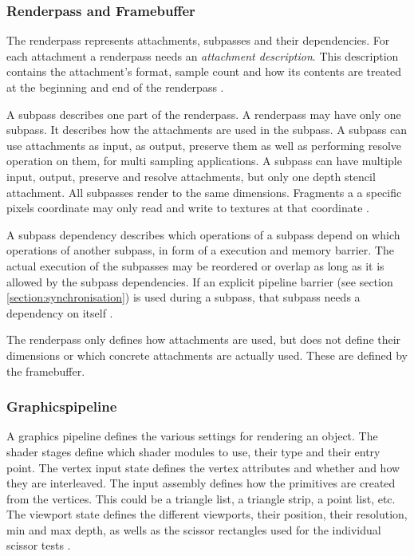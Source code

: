 \subsubsection{Renderpass and Framebuffer}
\label{section:renderpass}

The renderpass represents attachments, subpasses and their dependencies. For each attachment a renderpass needs an \textit{attachment description}. This description contains the attachment's format, sample count and how its contents are treated at the beginning and end of the renderpass \cite{khronos:vulkan:spec1.1}.

A subpass describes  one part of the renderpass. A renderpass may have only one subpass. It describes how the attachments are used in the subpass. A subpass can use attachments as input, as output, preserve them as well as performing resolve operation on them, for multi sampling applications. A subpass can have multiple input, output, preserve and resolve attachments, but only one depth stencil attachment. All subpasses render to the same dimensions. Fragments a a specific pixels coordinate may only read and write to textures at that coordinate \cite{khronos:vulkan:spec1.1}.

A subpass dependency describes which operations of a subpass depend on which operations of another subpass, in form of a execution and memory barrier. The actual execution of the subpasses may be reordered or overlap as long as it is allowed by the subpass dependencies. If an explicit pipeline barrier (see section \ref{section:synchronisation}) is used during a subpass, that subpass needs a dependency on itself \cite{khronos:vulkan:spec1.1}.

The renderpass only defines how attachments are used, but does not define their dimensions or which concrete attachments are actually used. These are defined by the framebuffer. 



\subsubsection{Graphicspipeline}
A graphics pipeline defines the various settings for rendering an object. The shader stages define which shader modules to use, their type and their entry point. The vertex input state defines the vertex attributes and whether and how they are interleaved. The input assembly defines how the primitives are created from the vertices. This could be a triangle list, a triangle strip, a point list, etc. The viewport state defines the different viewports, their position, their resolution, min and max depth, as wells as the scissor rectangles used for the individual scissor tests \cite{khronos:vulkan:spec1.1}.


